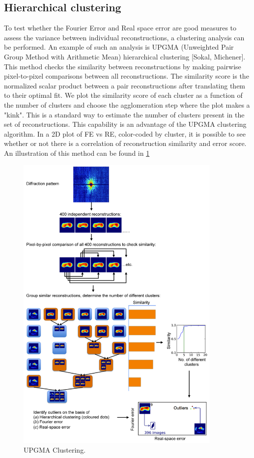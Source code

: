 \subsection{Hierarchical clustering}
To test whether the Fourier Error and Real space error are good measures to assess the variance between individual reconstructions, a clustering analysis can be performed. An example of such an analysis is UPGMA (Unweighted Pair Group Method with Arithmetic Mean) hierarchical clustering [Sokal, Michener]. This method checks the similarity between reconstructions by making pairwise pixel-to-pixel comparisons between all reconstructions. The similarity score is the normalized scalar product between a pair reconstructions after translating them to their optimal fit. We plot the similarity score of  each cluster as a function of the number of clusters and choose the agglomeration step where the plot makes a "kink". This is a standard way to estimate the number of clusters present in the set of reconstructions. This capability is an advantage of the UPGMA clustering algorithm. In a 2D plot of FE vs RE, color-coded by cluster, it is possible to see whether or not there is a correlation of reconstruction similarity and error score. An illustration of this method can be found in \ref{fig:UPGMA}
 
\begin{figure}[h]
	\centering 
		\includegraphics[width=100mm]{UPGMA_Clustering.jpg}
	\caption{UPGMA Clustering.}
	\label{fig:UPGMA}
\end{figure}

